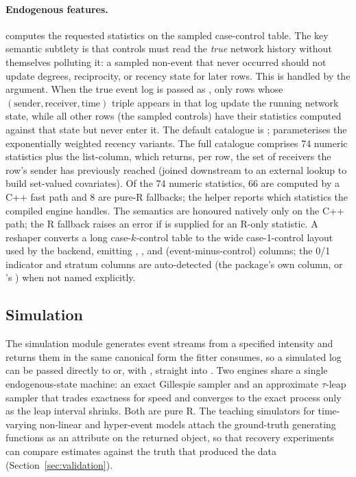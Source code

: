 \paragraph{Endogenous features.}
 computes the requested statistics on the
sampled case-control table. The key semantic subtlety is that controls must read
the \emph{true} network history without themselves polluting it: a sampled
non-event that never occurred should not update degrees, reciprocity, or recency
state for later rows. This is handled by the  argument. When
the true event log is passed as , only rows whose
\((\text{sender}, \text{receiver}, \text{time})\) triple appears in that log
update the running network state, while all other rows (the sampled controls)
have their statistics computed against that state but never enter it. The
default catalogue is ;  parameterises the exponentially
weighted recency variants. The full catalogue comprises 74 numeric statistics
plus the  list-column, which returns, per row, the
set of receivers the row's sender has previously reached (joined downstream to an
external lookup to build set-valued covariates). Of the 74 numeric statistics,
66 are computed by a C++ fast path and 8 are pure-R fallbacks; the
 helper reports which statistics the compiled
engine handles. The  semantics are honoured natively only on
the C++ path; the R fallback raises an error if  is supplied
for an R-only statistic. A  reshaper converts a long
case-\(k\)-control table to the wide case-1-control layout used by the 
backend, emitting , , and 
(event-minus-control) columns; the 0/1 indicator and stratum columns are
auto-detected (the package's own  column, or 's
) when not named explicitly.

\subsection{Simulation}
\label{sec:software-simulation}

The simulation module generates event streams from a specified intensity and
returns them in the same canonical form the fitter consumes, so a simulated log
can be passed directly to  or, with , straight into . Two engines share a single endogenous-state
machine: an exact Gillespie sampler and an approximate \(\tau\)-leap sampler
that trades exactness for speed and converges to the exact process only as the
leap interval shrinks. Both are pure R. The teaching simulators for
time-varying non-linear and hyper-event models attach the ground-truth
generating functions as an attribute on the returned object, so that recovery
experiments can compare estimates against the truth that produced the data
(Section~\ref{sec:validation}).

